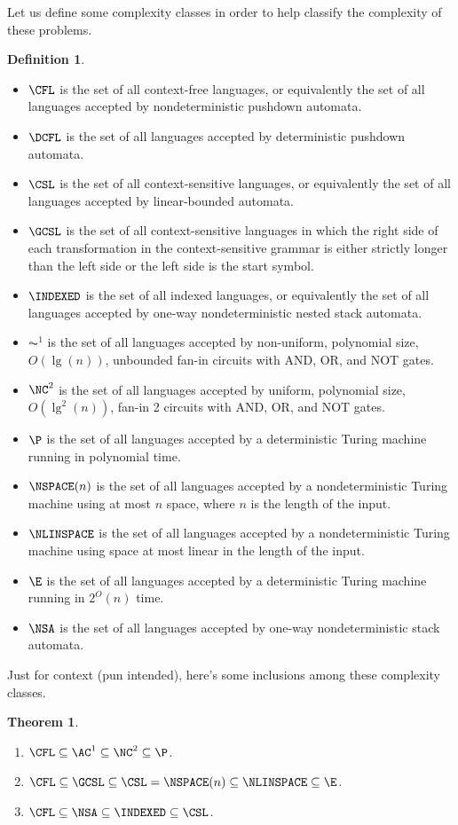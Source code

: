 \documentclass[draft]{article}
\newtheorem{theorem}{Theorem}
\theoremstyle{remark} \newtheorem{technicality}{Technical note}
\theoremstyle{definition} \newtheorem{definition}{Definition}
\begin{document}
Let us define some complexity classes in order to help classify the complexity of these problems.
\begin{definition}\mbox{}
  \begin{itemize}
  \item $\CFL$ is the set of all context-free languages, or equivalently the set of all languages accepted by nondeterministic pushdown automata.
  \item $\DCFL$ is the set of all languages accepted by deterministic pushdown automata.
  \item $\CSL$ is the set of all context-sensitive languages, or equivalently the set of all languages accepted by linear-bounded automata.
  \item $\GCSL$ is the set of all context-sensitive languages in which the right side of each transformation in the context-sensitive grammar is either strictly longer than the left side or the left side is the start symbol.
  \item $\INDEXED$ is the set of all indexed languages, or equivalently the set of all languages accepted by one-way nondeterministic nested stack automata.
  \item $\AC^1$ is the set of all languages accepted by non-uniform, polynomial size, $O(\lg(n))$, unbounded fan-in circuits with AND, OR, and NOT gates.
  \item $\NC^2$ is the set of all languages accepted by uniform, polynomial size, $O(\lg^2(n))$, fan-in 2 circuits with AND, OR, and NOT gates.
  \item $\P$ is the set of all languages accepted by a deterministic Turing machine running in polynomial time.
  \item $\NSPACE(n)$ is the set of all languages accepted by a nondeterministic Turing machine using at most $n$ space, where $n$ is the length of the input.
  \item $\NLINSPACE$ is the set of all languages accepted by a nondeterministic Turing machine using space at most linear in the length of the input.
  \item $\E$ is the set of all languages accepted by a deterministic Turing machine running in $2^O(n)$ time.
  \item $\NSA$ is the set of all languages accepted by one-way nondeterministic stack automata.
  \end{itemize}
\end{definition}
Just for context (pun intended), here's some inclusions among these complexity classes.
\begin{theorem}\mbox{}
  \begin{enumerate}
  \item $\CFL\subseteq\AC^1\subseteq\NC^2\subseteq\P$.
  \item $\CFL\subseteq\GCSL\subseteq\CSL=\NSPACE(n)\subseteq\NLINSPACE\subseteq\E$.
  \item $\CFL\subseteq\NSA\subseteq\INDEXED\subseteq\CSL$.
  \end{enumerate}
\end{theorem}
\end{document}
